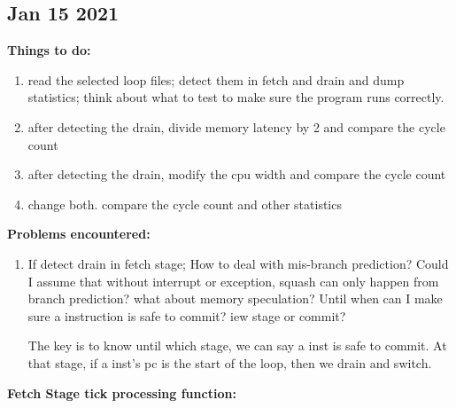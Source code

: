\documentclass[11pt]{article}
\begin{document}
\subsection{Jan 15 2021\\}


\textbf{Things to do:\\}

\begin{enumerate}
	\item read the selected loop files; detect them in fetch and drain and dump statistics; think about what to test to make sure the program runs correctly.
	
	\item after detecting the drain, divide memory latency by 2 and compare the cycle count
	
	\item after detecting the drain, modify the cpu width and compare the cycle count
	
	\item change both. compare the cycle count and other statistics
\end{enumerate}


\textbf{Problems encountered:\\}

\begin{enumerate}
	\item If detect drain in fetch stage; How to deal with mis-branch prediction? Could I assume that without interrupt or exception, squash can only happen from branch prediction? what about memory speculation? Until when can I make sure a instruction is safe to commit? iew stage or commit?
	
	The key is to know until which stage, we can say a inst is safe to commit. At that stage, if a inst's pc is the start of the loop, then we drain and switch.
\end{enumerate}

\textbf{Fetch Stage tick processing function:}
\end{document}
